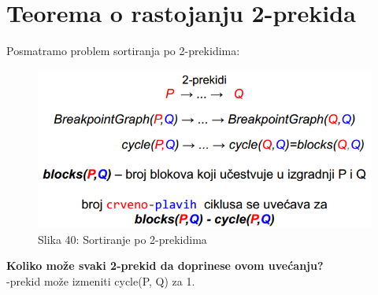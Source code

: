 \documentclass{article}
\begin{document}
\newpage
\section{Teorema o rastojanju 2-prekida}
Posmatramo problem sortiranja po 2-prekidima:
\begin{figure}[h!]
\centering
\includegraphics[scale=0.7]{slike/sortiranje2prekidi.PNG}
\caption{Slika 40: Sortiranje po 2-prekidima}
\label{slika:X}
\end{figure}

\noindent \textbf{Koliko može svaki 2-prekid da doprinese ovom uvećanju?}\\

-prekid može izmeniti cycle(P, Q) za 1.\\
\end{document}
